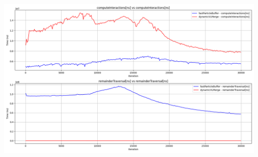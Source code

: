 \begin{center}
\includegraphics[width=\linewidth]{graphs/constantVelocityCube/normalExperiments/iter/vlpc08dvlpb.png}
\end{center}


